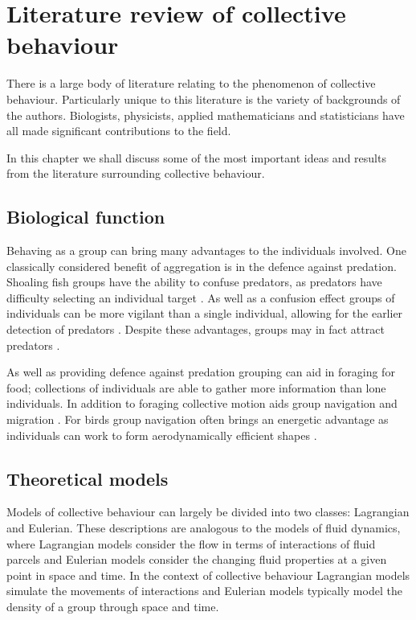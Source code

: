 \chapter{Literature review of collective behaviour}
\label{cha:lit_review}

There is a large body of literature relating to the phenomenon of collective behaviour. Particularly unique to this literature is the variety of backgrounds of the authors. Biologists, physicists, applied mathematicians and statisticians have all made significant contributions to the field.

In this chapter we shall discuss some of the most important ideas and results from the literature surrounding collective behaviour.

\section{Biological function}
\label{sec:biological_function}

Behaving as a group can bring many advantages to the individuals involved. One classically considered  benefit of aggregation is in the defence against predation. Shoaling fish groups have the ability to confuse predators, as predators have difficulty selecting an individual target \citep{landeau86}. As well as a confusion effect groups of individuals can be more vigilant than a single individual, allowing for the earlier detection of predators \citep{pitcher93}. Despite these advantages, groups may in fact attract predators \citep{wittenberger85}.

As well as providing defence against predation grouping can aid in foraging for food; collections of individuals are able to gather more information than lone individuals. In addition to foraging collective motion aids group navigation and migration \citep{simmons04}. For birds group navigation often brings an energetic advantage as individuals can work to form aerodynamically efficient shapes \citep{weimerskirch01}.

\section{Theoretical models}
\label{sec:models}

Models of collective behaviour can largely be divided into two classes: Lagrangian and Eulerian. These descriptions are analogous to the models of fluid dynamics, where Lagrangian models consider the flow in terms of interactions of fluid parcels and Eulerian models consider the changing fluid properties at a given point in space and time. In the context of collective behaviour Lagrangian models simulate the movements of interactions and Eulerian models typically model the density of a group through space and time.


